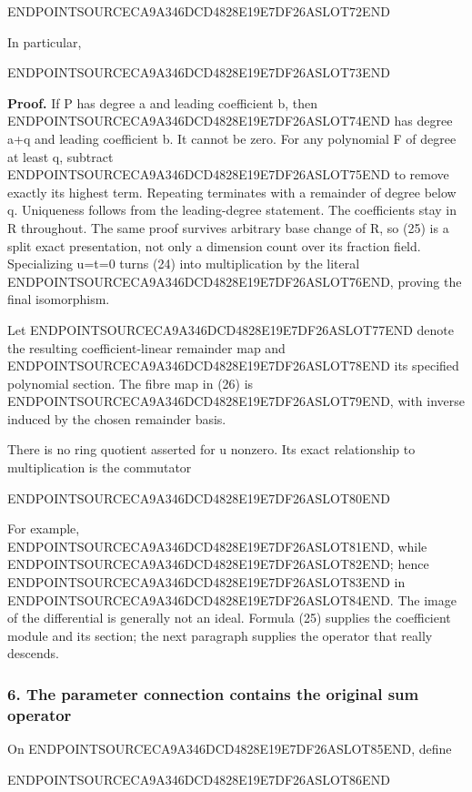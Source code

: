 ENDPOINTSOURCECA9A346DCD4828E19E7DF26ASLOT72END

In particular,

ENDPOINTSOURCECA9A346DCD4828E19E7DF26ASLOT73END

\textbf{Proof.} If P has degree a and leading coefficient b, then ENDPOINTSOURCECA9A346DCD4828E19E7DF26ASLOT74END has degree a+q and leading coefficient b. It cannot be zero. For any polynomial F of degree at least q, subtract ENDPOINTSOURCECA9A346DCD4828E19E7DF26ASLOT75END to remove exactly its highest term. Repeating terminates with a remainder of degree below q. Uniqueness follows from the leading-degree statement. The coefficients stay in R throughout. The same proof survives arbitrary base change of R, so (25) is a split exact presentation, not only a dimension count over its fraction field. Specializing u=t=0 turns (24) into multiplication by the literal ENDPOINTSOURCECA9A346DCD4828E19E7DF26ASLOT76END, proving the final isomorphism.

Let ENDPOINTSOURCECA9A346DCD4828E19E7DF26ASLOT77END denote the resulting coefficient-linear remainder map and ENDPOINTSOURCECA9A346DCD4828E19E7DF26ASLOT78END its specified polynomial section. The fibre map in (26) is ENDPOINTSOURCECA9A346DCD4828E19E7DF26ASLOT79END, with inverse induced by the chosen remainder basis.

There is no ring quotient asserted for u nonzero. Its exact relationship to multiplication is the commutator

ENDPOINTSOURCECA9A346DCD4828E19E7DF26ASLOT80END

For example, ENDPOINTSOURCECA9A346DCD4828E19E7DF26ASLOT81END, while ENDPOINTSOURCECA9A346DCD4828E19E7DF26ASLOT82END; hence ENDPOINTSOURCECA9A346DCD4828E19E7DF26ASLOT83END in ENDPOINTSOURCECA9A346DCD4828E19E7DF26ASLOT84END. The image of the differential is generally not an ideal. Formula (25) supplies the coefficient module and its section; the next paragraph supplies the operator that really descends.

\subsubsection{6. The parameter connection contains the original sum operator}\label{endpoint-exponential_original--the-parameter-connection-contains-the-original-sum-operator}

On ENDPOINTSOURCECA9A346DCD4828E19E7DF26ASLOT85END, define

ENDPOINTSOURCECA9A346DCD4828E19E7DF26ASLOT86END

